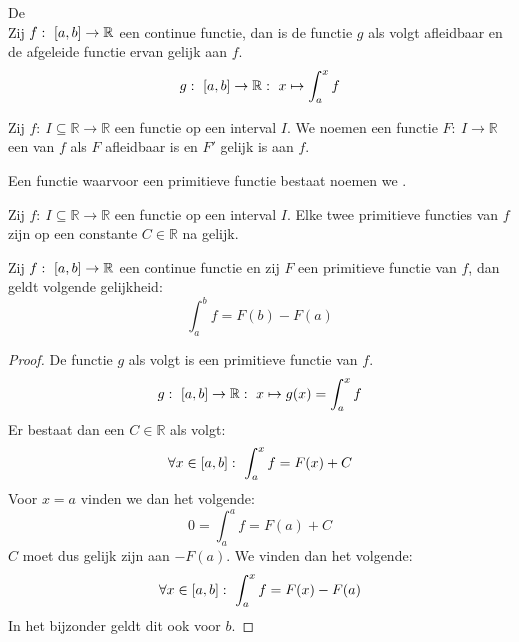 \documentclass[main.tex]{subfiles}
\begin{document}
\begin{bst}
  \label{st:hoofdstelling}
  De \\
  Zij $f:\ \interval{a}{b} \rightarrow \mathbb{R}$ een continue functie, dan is de functie $g$ als volgt afleidbaar en de afgeleide functie ervan gelijk aan $f$.
  \[ g:\ \interval{a}{b} \rightarrow \mathbb{R}:\ x \mapsto \int_{a}^{x}f \]
\end{bst}

\begin{de}
  Zij $f:\ I \subseteq \mathbb{R} \rightarrow \mathbb{R}$ een functie op een interval $I$.
  We noemen een functie $F:\ I \rightarrow \mathbb{R}$ een  van $f$ als $F$ afleidbaar is en $F'$ gelijk is aan $f$.
\end{de}

\begin{de}
  Een functie waarvoor een primitieve functie bestaat noemen we .
\end{de}

\begin{bpr}
  \label{pr:primitieve-functies-op-constante-na-gelijk}
  Zij $f:\ I \subseteq \mathbb{R}\rightarrow \mathbb{R}$ een functie op een interval $I$.
  Elke twee primitieve functies van $f$ zijn op een constante $C\in \mathbb{R}$ na gelijk.
\end{bpr}

\begin{bpr}
  Zij $f:\ \interval{a}{b} \rightarrow \mathbb{R}$ een continue functie en zij $F$ een primitieve functie van $f$, dan geldt volgende gelijkheid:
  \[ \int_{a}^{b}f = F(b) - F(a) \]

  \begin{proof}
    De functie $g$ als volgt is een primitieve functie van $f$.
    \[ g:\ \interval{a}{b} \rightarrow \mathbb{R}:\ x \mapsto g(x) = \int_{a}^{x}f \]
    Er bestaat dan een $C\in\mathbb{R}$ als volgt:
    \[ \forall x\in\interval{a}{b}:\ \int_{a}^{x}f = F(x) + C \]
    Voor $x=a$ vinden we dan het volgende:
    \[ 0 = \int_{a}^{a}f = F(a) + C \]
    $C$ moet dus gelijk zijn aan $-F(a)$.
    We vinden dan het volgende:
    \[ \forall x\in\interval{a}{b}:\ \int_{a}^{x}f = F(x)-F(a) \]
    In het bijzonder geldt dit ook voor $b$.
  \end{proof}
\end{bpr}
\end{document}
